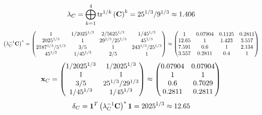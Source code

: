 \documentclass[10pt,a4paper]{article}
\begin{document}
	\[
		\lambda_{C} =  \bigoplus ^{4} _{k = 1} \operatorname{tr} ^{1 / k} \left( \bold{C} \right)^k = {{25^ {1 / 3}}} / {{9^ {1 / 3}}}\approx 1.406
	\]
	\[
		\left(\lambda_{C}^{-1}\bold{C}\right)^* = 
		\begin{pmatrix}
			{1}{} & {1} / {{2025^ {1 / 3}}} & {{2}} / {{5625^ {1 / 3}}} & {1} / {{45^ {1 / 3}}} \\
			{{2025^ {1 / 3}}}{} & {1}{} & {{2}{9^ {1 / 3}}} / {{25^ {1 / 3}}} & {{45^ {1 / 3}}}{} \\
			{{2187^ {1 / 3}}} / {{5^ {1 / 3}}} & {{3}} / {{5}} & {1}{} & {{243^ {1 / 3}}} / {{25^ {1 / 3}}} \\
			{{45^ {1 / 3}}}{} & {1} / {{45^ {1 / 3}}} & {{2}} / {{5}} & {1}{} \\
		\end{pmatrix}
		\approx
		\begin{pmatrix}
			1        & 0.07904  & 0.1125   & 0.2811   \\
			12.65    & 1        & 1.423    & 3.557    \\
			7.591    & 0.6      & 1        & 2.134    \\
			3.557    & 0.2811   & 0.4      & 1        \\
		\end{pmatrix}
	\]
	\[
		\bold{x}_{C} = 
		\begin{pmatrix}
			{1} / {{2025^ {1 / 3}}} & {1} / {{2025^ {1 / 3}}} \\
			{1}{} & {1}{} \\
			{{3}} / {{5}} & {{25^ {1 / 3}}} / {{2}{9^ {1 / 3}}} \\
			{1} / {{45^ {1 / 3}}} & {1} / {{45^ {1 / 3}}} \\
		\end{pmatrix}
		\approx
		\begin{pmatrix}
			0.07904  & 0.07904  \\
			1        & 1        \\
			0.6      & 0.7029   \\
			0.2811   & 0.2811   \\
		\end{pmatrix}
	\]
	\[
		\delta_{C} = \bold{1}^T \left(\lambda_{C}^{-1}\bold{C}\right)^* \bold{1} = {{2025^ {1 / 3}}}{}\approx 12.65
	\]
\end{document}
